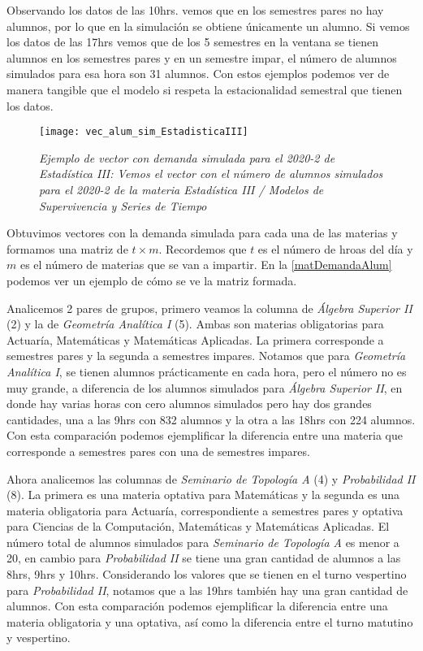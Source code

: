 Observando los datos de las 10hrs. vemos que en los semestres pares no hay alumnos, por lo que en la simulación se obtiene únicamente un alumno. Si vemos los datos de las 17hrs vemos que de los 5 semestres en la ventana se tienen alumnos en los semestres pares y en un semestre impar, el número de alumnos simulados para esa hora son 31 alumnos. Con estos ejemplos podemos ver de manera tangible que el modelo si respeta la estacionalidad semestral que tienen los datos.

\begin{figure}[H]
\centering
\texttt{[image: vec\_alum\_sim\_EstadisticaIII]} %
\caption[\textit{Ejemplo de vector con demanda simulada para el 2020-2 de Estadística III}]{\textit{Ejemplo de vector con demanda simulada para el 2020-2 de Estadística III: Vemos el vector con el número de alumnos simulados para el 2020-2 de la materia Estadística III / Modelos de Supervivencia y Series de Tiempo}}\label{vec_alum_sim}
\end{figure}

Obtuvimos vectores con la demanda simulada para cada una de las materias y formamos una matriz de $t \times m$. Recordemos que $t$ es el número de hroas del día y $m$ es el número de materias que se van a impartir. En la \figurename{\ref{matDemandaAlum}} podemos ver un ejemplo de cómo se ve la matriz formada.

Analicemos 2 pares de grupos, primero veamos la columna de \textit{Álgebra Superior II} (2) y la de \textit{Geometría Analítica I} (5). Ambas son materias obligatorias para Actuaría, Matemáticas y Matemáticas Aplicadas. La primera corresponde a semestres pares y la segunda a semestres impares. Notamos que para \textit{Geometría Analítica I}, se tienen alumnos prácticamente en cada hora, pero el número no es muy grande, a diferencia de los alumnos simulados para \textit{Álgebra Superior II}, en donde hay varias horas con cero alumnos simulados pero hay dos grandes cantidades, una a las 9hrs con 832 alumnos y la otra a las 18hrs con 224 alumnos. Con esta comparación podemos ejemplificar la diferencia entre una materia que corresponde a semestres pares con una de semestres impares.

Ahora analicemos las columnas de \textit{Seminario de Topología A} (4) y \textit{Probabilidad II} (8). La primera es una materia optativa para Matemáticas y la segunda es una materia obligatoria para Actuaría, correspondiente a semestres pares y optativa para Ciencias de la Computación, Matemáticas y Matemáticas Aplicadas. El número total de alumnos simulados para \textit{Seminario de Topología A} es menor a 20, en cambio para \textit{Probabilidad II} se tiene una gran cantidad de alumnos a las 8hrs, 9hrs y 10hrs. Considerando los valores que se tienen en el turno vespertino para \textit{Probabilidad II}, notamos que a las 19hrs también hay una gran cantidad de alumnos. Con esta comparación podemos ejemplificar la diferencia entre una materia obligatoria y una optativa, así como la diferencia entre el turno matutino y vespertino.


